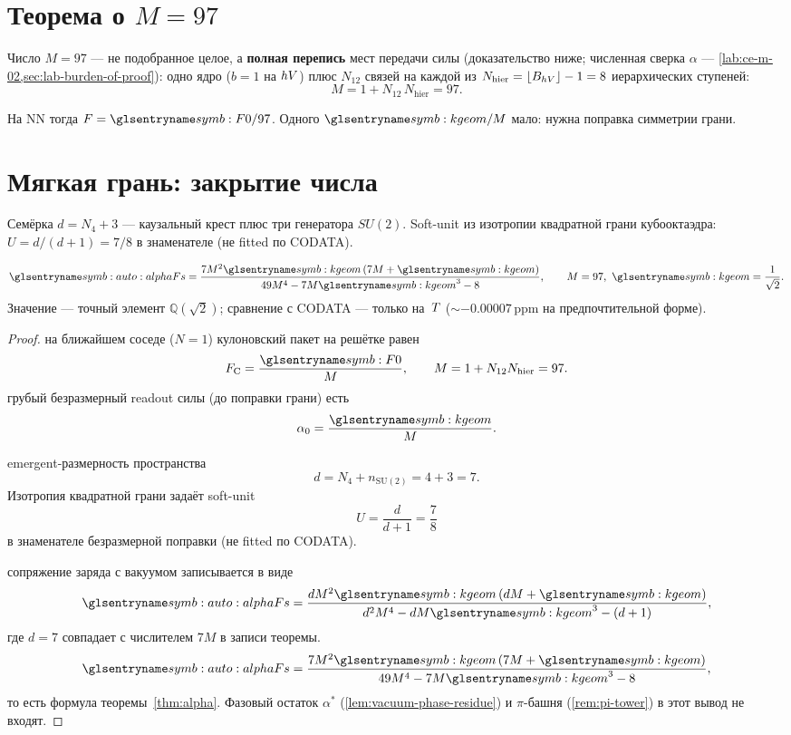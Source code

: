 \section{Теорема о $M=97$}

\begin{theorem}
\label{thm:M97}
Число $M=97$ --- не подобранное целое, а \textbf{полная перепись} мест передачи силы
(доказательство ниже; численная сверка $\alpha$ --- \cref{lab:ce-m-02,sec:lab-burden-of-proof}):
одно ядро ($b=1$ на $hV$) плюс $N_{12}$ связей на каждой из
$N_{\mathrm{hier}}=\lfloor B_{hV}\rfloor-1=8$ иерархических ступеней:
\[
  M = 1 + N_{12}\,N_{\mathrm{hier}} = 97.
\]
\end{theorem}

На NN тогда $F=\ladderForce/97$.
Одного $\caKappaGeom/M$ мало: нужна поправка симметрии грани.

\section{Мягкая грань: закрытие числа}

Семёрка $d=N_4+3$ --- каузальный крест плюс три генератора $SU(2)$.
Soft-unit из изотропии квадратной грани кубооктаэдра:
$U=d/(d+1)=7/8$ в знаменателе (не fitted по CODATA).

\begin{theorem}
\label{thm:alpha}
\[
  \alphaFs
  =
  \frac{7M^{2}\caKappaGeom\,(7M+\caKappaGeom)}
       {49M^{4}-7M\caKappaGeom^{3}-8},
  \qquad M=97,\ \caKappaGeom=\frac{1}{\sqrt{2}}.
\]
Значение --- точный элемент $\mathbb{Q}(\sqrt{2})$;
сравнение с CODATA --- только на~$T$ ($\sim -0.00007$\,ppm на предпочтительной форме).
\end{theorem}

\begin{proof}
на ближайшем соседе ($N=1$) кулоновский пакет на решётке равен
\[
  F_{\mathrm{C}}=\frac{\ladderForce}{M},\qquad M=1+N_{12}N_{\mathrm{hier}}=97.
\]
\pfollows
грубый безразмерный readout силы (до поправки грани) есть
\[
  \alpha_0=\frac{\caKappaGeom}{M}.
\]

emergent-размерность пространства
\[
  d=N_4+n_{\mathrm{SU}(2)}=4+3=7.
\]
Изотропия квадратной грани задаёт soft-unit
\[
  U=\frac{d}{d+1}=\frac{7}{8}
\]
в знаменателе безразмерной поправки (не fitted по CODATA).

сопряжение заряда с вакуумом записывается в виде
\[
  \alphaFs
  =
  \frac{dM^{2}\caKappaGeom\,(dM+\caKappaGeom)}
       {d^{2}M^{4}-dM\caKappaGeom^{3}-(d+1)},
\]
где $d=7$ совпадает с числителем $7M$ в записи теоремы.
\[
  \alphaFs
  =
  \frac{7M^{2}\caKappaGeom\,(7M+\caKappaGeom)}
       {49M^{4}-7M\caKappaGeom^{3}-8},
\]
то есть формула теоремы~\ref{thm:alpha}.
Фазовый остаток $\alpha^*$ (\cref{lem:vacuum-phase-residue}) и $\pi$-башня (\cref{rem:pi-tower}) в этот вывод не входят.
\end{proof}

